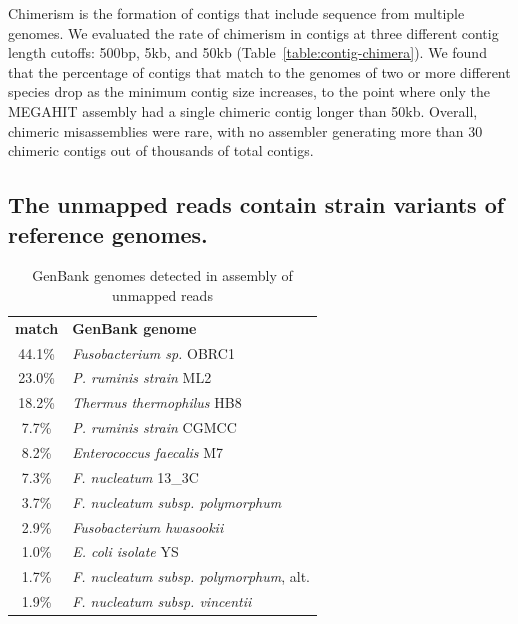 \documentclass[11pt]{article}
\begin{document}

Chimerism is the formation of contigs that include sequence from
multiple genomes.  We evaluated the rate of chimerism in contigs at
three different contig length cutoffs: 500bp, 5kb, and 50kb
(Table~\ref{table:contig-chimera}).  We found that the percentage of
contigs that match to the genomes of two or more different species
drop as the minimum contig size increases, to the point where only the
MEGAHIT assembly had a single chimeric contig longer than 50kb.
Overall, chimeric misassemblies were rare, with no assembler
generating more than 30 chimeric contigs out of thousands of total
contigs.

\subsection*{The unmapped reads contain strain variants of reference genomes.}





\begin{table}[t]
\caption{GenBank genomes detected in assembly of unmapped reads}
\centering
\begin{tabular}{|c|l|}
\hline

\textbf{match}& \textbf{GenBank genome} \\ [0.5ex] %
44.1\% & {\em \small Fusobacterium sp.} OBRC1 \\
\hline
23.0\% & {\em \small P. ruminis strain} ML2 \\
\hline
18.2\% & {\em \small Thermus thermophilus} HB8 \\
\hline
7.7\% & {\em \small P. ruminis strain} CGMCC \\
\hline
8.2\% & {\em \small Enterococcus faecalis} M7 \\
\hline
7.3\% & {\em \small F. nucleatum} 13\_3C  \\
\hline
3.7\% & {\em \small F. nucleatum subsp. polymorphum} \\
\hline
2.9\% & {\em \small Fusobacterium hwasookii} \\
\hline
1.0\% & {\em \small E. coli isolate} YS \\
\hline
1.7\% & {\em \small F. nucleatum subsp. polymorphum}, alt. \\
\hline
1.9\% & {\em \small F. nucleatum subsp. vincentii} \\
\hline

\end{tabular}
\label{table:gather}
\end{table}
\end{document}
